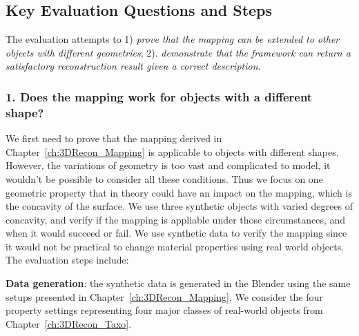 \subsection{Key Evaluation Questions and Steps}

The evaluation attempts to 1) \textit{prove that the mapping can be extended to other objects with different geometries}; 2). \textit{demonstrate that the framework can return a satisfactory reconstruction result given a correct description}.

\subsubsection{1. Does the mapping work for objects with a different shape?}
We first need to prove that the mapping derived in Chapter~\ref{ch:3DRecon_Mapping} is applicable to objects with different shapes. However, the variations of geometry is too vast and complicated to model, it wouldn't be possible to consider all these conditions. Thus we focus on one geometric property that in theory could have an impact on the mapping, which is the concavity of the surface. We use three synthetic objects with varied degrees of concavity, and verify if the mapping is appliable under those circumstances, and when it would succeed or fail. We use synthetic data to verify the mapping since it would not be practical to change material properties using real world objects. The evaluation steps include:


\noindent\textbf{Data generation}: the synthetic data is generated in the Blender using the same setups presented in Chapter~\ref{ch:3DRecon_Mapping}. We consider the four property settings representing four major classes of real-world objects from Chapter~\ref{ch:3DRecon_Taxo}.



